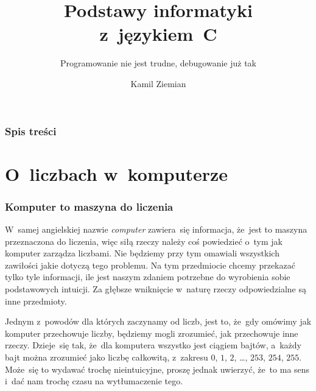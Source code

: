 \documentclass[10pt,t]{beamer}
\title{Podstawy informatyki z~językiem~C}
\subtitle{Programowanie nie jest trudne, debugowanie już tak}
\author{Kamil Ziemian \\
  \email}
\begin{document}





\RaggedRight





\maketitle





\begin{frame}
  \frametitle{Spis treści}


  \tableofcontents

\end{frame}










\section{O~liczbach w~komputerze}


\begin{frame}
  \frametitle{Komputer to maszyna do liczenia}


  W~samej angielskiej nazwie \textit{computer} zawiera~się informacja,
  że~jest to maszyna przeznaczona do liczenia, więc siłą rzeczy należy
  coś powiedzieć o~tym jak komputer zarządza liczbami. Nie będziemy przy
  tym omawiali wszystkich zawiłości jakie dotyczą tego problemu. Na tym
  przedmiocie chcemy przekazać tylko tyle informacji, ile jest
  naszym zdaniem potrzebne do wyrobienia sobie podstawowych intuicji.
  Za głębsze wniknięcie w~naturę rzeczy odpowiedzialne są inne przedmioty.

  Jednym z~powodów dla których zaczynamy od liczb, jest to, że~gdy omówimy
  jak komputer przechowuje liczby, będziemy mogli zrozumieć, jak przechowuje
  inne rzeczy. Dzieje~się tak, że~dla komputera wszystko jest ciągiem
  bajtów, a~każdy bajt można zrozumieć jako liczbę całkowitą, z~zakresu
  $0$, $1$, $2$, \ldots, $253$, $254$, $255$. Może~się to wydawać trochę
  nieintuicyjne, proszę jednak uwierzyć, że~to ma sens i~dać nam trochę
  czasu na wytłumaczenie tego.

\end{frame}
\end{document}
